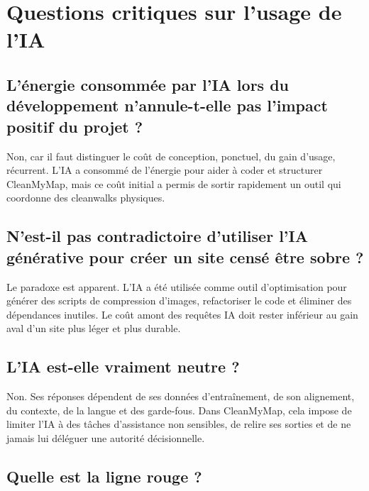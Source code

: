 \documentclass[
  10pt,
  a4paper,
  DIV=11,
  numbers=noendperiod,
  oneside]{scrreprt}
\begin{document}
\section{Questions critiques sur l'usage de
l'IA}\label{questions-critiques-sur-lusage-de-lia}

\subsection{L'énergie consommée par l'IA lors du développement
n'annule-t-elle pas l'impact positif du projet
?}\label{luxe9nergie-consommuxe9e-par-lia-lors-du-duxe9veloppement-nannule-t-elle-pas-limpact-positif-du-projet}

Non, car il faut distinguer le coût de conception, ponctuel, du gain
d'usage, récurrent. L'IA a consommé de l'énergie pour aider à coder et
structurer CleanMyMap, mais ce coût initial a permis de sortir
rapidement un outil qui coordonne des cleanwalks physiques.

\subsection{N'est-il pas contradictoire d'utiliser l'IA générative pour
créer un site censé être sobre
?}\label{nest-il-pas-contradictoire-dutiliser-lia-guxe9nuxe9rative-pour-cruxe9er-un-site-censuxe9-uxeatre-sobre}

Le paradoxe est apparent. L'IA a été utilisée comme outil d'optimisation
pour générer des scripts de compression d'images, refactoriser le code
et éliminer des dépendances inutiles. Le coût amont des requêtes IA doit
rester inférieur au gain aval d'un site plus léger et plus durable.

\subsection{L'IA est-elle vraiment neutre
?}\label{lia-est-elle-vraiment-neutre}

Non. Ses réponses dépendent de ses données d'entraînement, de son
alignement, du contexte, de la langue et des garde-fous. Dans
CleanMyMap, cela impose de limiter l'IA à des tâches d'assistance non
sensibles, de relire ses sorties et de ne jamais lui déléguer une
autorité décisionnelle.

\subsection{Quelle est la ligne rouge
?}\label{quelle-est-la-ligne-rouge}
\end{document}
